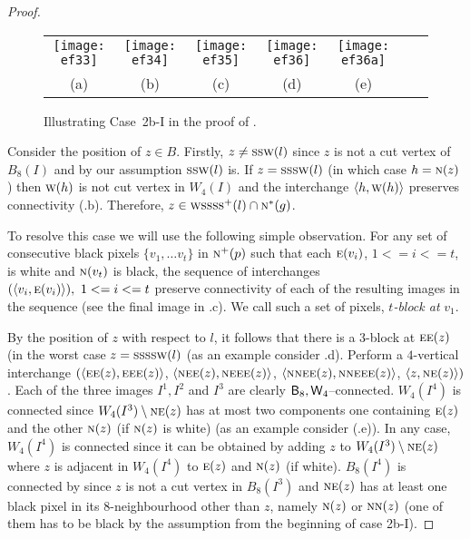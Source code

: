 \documentclass[lotsofwhite,charterfonts]{patmorin}
\newcommand{\eightfour}{\ensuremath{\protect\textup{\textsf{B}}_{8},\protect\textup{\textsf{W}}_{4}}}
\newcommand{\N}{\textsc{n}}
\newcommand{\NE}{\textsc{ne}}
\newcommand{\E}{\textsc{e}}
\renewcommand{\S}{\textsc{s}}
\newcommand{\W}{\textsc{w}}
\newcommand{\ic}[2]{\langle #1,#2 \rangle}
\newcommand{\sm}{\ensuremath{\setminus}}
\begin{document}
\begin{proof}
\begin{figure}[htbp]
\begin{center}
\begin{tabular}{ccccccc}
\texttt{[image: ef33]} & 
\texttt{[image: ef34]} & 
\texttt{[image: ef35]} &  
\texttt{[image: ef36]} &
\texttt{[image: ef36a]} 
\\
(a) & (b) & (c) & (d) & (e)
\end{tabular}
\end{center}
\caption{Illustrating Case~2b-I in the proof of .}
\end{figure}


Consider the position of $z\in B$. Firstly, $z\not=\S\S\W(l)$ since $z$ is not a cut vertex of $B_8(I)$ and by our assumption $\S\S\W(l)$ is. If $z=\S\S\S\W(l)$  (in which case $h=\N(z)$) then $\W(h)$ is not cut vertex in $W_4(I)$ and the interchange $\ic{h}{\W(h)}$ preserves connectivity  (.b). Therefore, $z\in \W\S\S\S\S^+(l) \cap \N^*(g)$.

To resolve this case we will use the following simple observation. For any  set of consecutive black pixels $\{v_1, \dots v_t\}$ in $\N^+(p)$ such that each $\E(v_i)$, $1<=i<=t$, is white and $\N(v_t)$ is black, the sequence of interchanges $(\ic{v_i}{\E(v_i)}),\ 1<=i<=t$ preserve connectivity of each of the resulting images in the sequence (see the final image in .c). We call such a set of pixels, {\em $t$-block at} $v_1$. 

By the position of $z$ with respect to $l$, it follows that there is a $3$-block at $\E\E(z)$ (in the worst case $z=\S\S\S\S\W(l)$ (as an example consider .d). Perform a  $4$-vertical interchange $(\ic{\E\E(z)}{\E\E\E(z)}$, $\ic{\NE\E(z)}{\NE\E\E(z)}$, $\ic{\N\NE\E(z)}{\N\NE\E\E(z)}$, $\ic{z}{\NE(z)})$. Each of the three images $I^1, I^2$ and $I^3$ are clearly $\eightfour$--connected. $W_4(I^4)$ is connected since $W_4(I^3)\sm \NE(z)$ has at most two components one containing $\E(z)$ and the other $\N(z)$ (if $\N(z)$ is white) (as an example consider (.e)). In any case, $W_4(I^4)$ is connected since it can be obtained by adding $z$ to $W_4(I^3)\sm \NE(z)$ where $z$ is adjacent in $W_4(I^4)$ to $\E(z)$ and $\N(z)$ (if white). $B_8(I^4)$ is connected by  since $z$ is not a cut vertex in $B_8(I^3)$ and $\NE(z)$ has at least one black pixel in its $8$-neighbourhood other than $z$, namely $\N(z)$ or $\N\N(z)$ (one of them has to be black by the assumption from the beginning of case 2b-I).


\end{proof}
\end{document}
